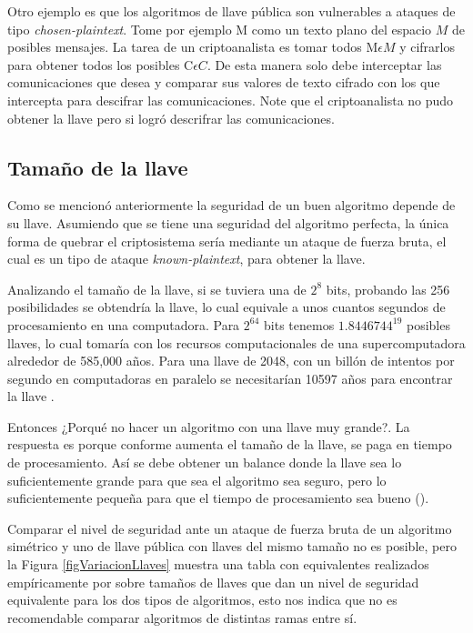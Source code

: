 Otro ejemplo es que los algoritmos de llave pública son vulnerables a ataques de tipo \textit{chosen-plaintext}. Tome por ejemplo M como un texto plano del espacio $M$ de posibles mensajes. La tarea de un criptoanalista es tomar todos $\text{M} \epsilon M$ y cifrarlos para obtener todos los posibles $\text{C} \epsilon C$. De esta manera solo debe interceptar las comunicaciones que desea y comparar sus valores de texto cifrado con los que intercepta para descifrar las comunicaciones. Note que el criptoanalista no pudo obtener la llave pero si logró descrifrar las comunicaciones.


\subsection{Tamaño de la llave}
Como se mencionó anteriormente la seguridad de un buen algoritmo depende de su llave. Asumiendo que se tiene una seguridad del algoritmo perfecta, la única forma de quebrar el criptosistema sería mediante un ataque de fuerza bruta, el cual es un tipo de ataque \textit{known-plaintext}, para obtener la llave. 

Analizando el tamaño de la llave, si se tuviera una de $2^8$ bits, probando las 256 posibilidades se obtendría la llave, lo cual equivale a unos cuantos segundos de procesamiento en una computadora. Para $2^{64}$ bits tenemos $1.8446744^{19}$ posibles llaves, lo cual tomaría con los recursos computacionales de una supercomputadora alrededor de 585,000 años. Para una llave de 2048, con un billón de intentos por segundo en computadoras en paralelo se necesitarían 10597 años para encontrar la llave \cite{bruce}. 


Entonces ¿Porqué no hacer un algoritmo con una llave muy grande?. La respuesta es porque conforme aumenta el tamaño de la llave, se paga en tiempo de procesamiento. Así se debe obtener un balance donde la llave sea lo suficientemente grande para que sea el algoritmo sea seguro, pero lo suficientemente pequeña para que el tiempo de procesamiento sea bueno (\cite{bruce}).

Comparar el nivel de seguridad ante un ataque de fuerza bruta de un algoritmo simétrico y uno de llave pública con llaves del mismo tamaño no es posible, pero la Figura \ref{figVariacionLlaves} muestra una tabla con equivalentes realizados empíricamente por \cite{bruce} sobre tamaños de llaves que dan un nivel de seguridad equivalente para los dos tipos de algoritmos, esto nos indica que no es recomendable comparar algoritmos de distintas ramas entre sí.


